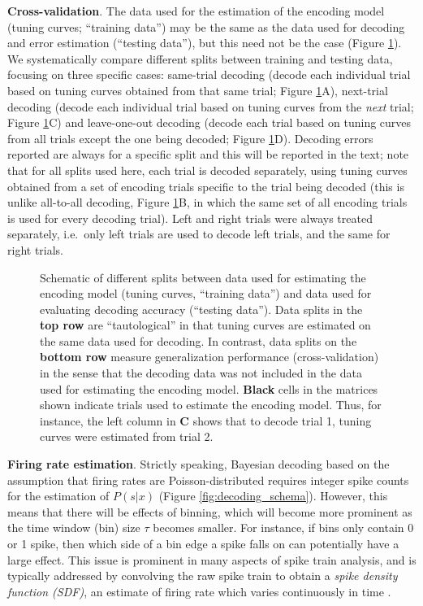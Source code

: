 \documentclass[11pt]{article}
\newcommand{\bsf}[1]{\textbf{#1}}
\let\cite=\citep
\begin{document}
{\bf Cross-validation}. The data used for the estimation of the
encoding model (tuning curves; ``training data'') may be the same as
the data used for decoding and error estimation (``testing data''),
but this need not be the case (Figure \ref{fig:decschemes}). We
systematically compare different splits between training and testing
data, focusing on three specific cases: same-trial decoding (decode
each individual trial based on tuning curves obtained from that same
trial; Figure \ref{fig:decschemes}A), next-trial decoding (decode each
individual trial based on tuning curves from the {\it next} trial;
Figure \ref{fig:decschemes}C) and leave-one-out decoding (decode each
trial based on tuning curves from all trials except the one being
decoded; Figure \ref{fig:decschemes}D). Decoding errors reported are
always for a specific split and this will be reported in the text;
note that for all splits used here, each trial is decoded separately,
using tuning curves obtained from a set of encoding trials specific to
the trial being decoded (this is unlike all-to-all decoding, Figure
\ref{fig:decschemes}B, in which the same set of all encoding trials is
used for every decoding trial). Left and right trials were always
treated separately, i.e.\ only left trials are used to decode left
trials, and the same for right trials.

\begin{figure}[h]
  \centering
  \caption{Schematic of different splits between data used for
    estimating the encoding model (tuning curves, ``training data'')
    and data used for evaluating decoding accuracy (``testing
    data''). Data splits in the \bsf{top row} are ``tautological'' in
    that tuning curves are estimated on the same data used for
    decoding. In contrast, data splits on the \bsf{bottom row} measure
    generalization performance (cross-validation) in the sense that
    the decoding data was not included in the data used for estimating
    the encoding model. \bsf{Black} cells in the matrices shown
    indicate trials used to estimate the encoding model. Thus, for
    instance, the left column in {\bsf C} shows that to decode trial
    1, tuning curves were estimated from trial 2.}
  \label{fig:decschemes}
\end{figure}

{\bf Firing rate estimation}. Strictly speaking, Bayesian decoding
based on the assumption that firing rates are Poisson-distributed
requires integer spike counts for the estimation of $P(s|x)$ (Figure
\ref{fig:decoding_schema}). However, this means that there will be
effects of binning, which will become more prominent as the time
window (bin) size $\tau$ becomes smaller. For instance, if bins only
contain 0 or 1 spike, then which side of a bin edge a spike falls on
can potentially have a large effect. This issue is prominent in many
aspects of spike train analysis, and is typically addressed by
convolving the raw spike train to obtain a {\it spike density function
  (SDF)}, an estimate of firing rate which varies continuously in time
\cite{Cunningham2009a,kass2014analysis}.
\end{document}
